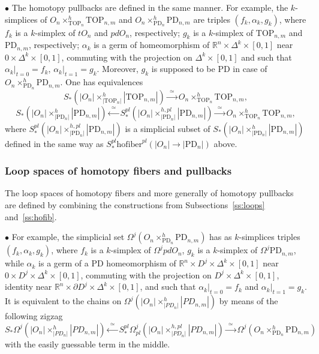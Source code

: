 \documentclass[11pt]{amsart}
\theoremstyle{definition}
\newcommand{\R}{{\mathbb R}}
\newcommand{\TOP}{\mathrm{TOP}}
\newcommand{\PD}{\mathrm{PD}}
\newcommand{\hofiber}{\mathrm{hofiber}}
\numberwithin{equation}{section}
\begin{document}
$\bullet$ The homotopy pullbacks are defined in the same manner. For example, the $k$-simplices of $O_n\times_{\TOP_n}^h\TOP_{n,m}$ and
$O_n\times_{\PD_n}^h \PD_{n,m}$ are triples $(f_k,\alpha_k,g_k)$, where $f_k$ is a $k$-simplex of $tO_n$ and $pdO_n$, respectively;
$g_k$ is a $k$-simplex of $\TOP_{n,m}$ and $\PD_{n,m}$, respectively; $\alpha_k$ is a germ of homeomorphism of $\R^n\times \Delta^k\times [0,1]$
near $0\times \Delta^k\times [0,1]$, commuting with the projection on $\Delta^k\times [0,1]$ and such that $\alpha_k|_{t=0}=f_k$, $\alpha_k|_{t=1}=g_k$.
Moreover, $g_k$ is supposed to be PD in case of $O_n\times_{\PD_n}^h \PD_{n,m}$. One has equivalences
\[
S_*\left(|O_n|\times^h_{|\TOP_n|}|\TOP_{n,m}|\right)\xrightarrow{\,\,\simeq\,\,} O_n\times_{\TOP_n}^h\TOP_{n,m},
\]
\[
S_*\left(|O_n|\times^h_{|\PD_n|}|\PD_{n,m}|\right)
\xleftarrow{\,\,\simeq\,\,}S_*^{pl}\left(|O_n|\times^{h,pl}_{|\PD_n|}|\PD_{n,m}|\right)\xrightarrow{\,\,\simeq\,\,} O_n\times_{\TOP_n}^h\TOP_{n,m},
\]
where $S_*^{pl}\left(|O_n|\times^{h,pl}_{|\PD_n|}|\PD_{n,m}|\right)$ is a simplicial subset of $S_*\left(|O_n|\times^h_{|\PD_n|}|\PD_{n,m}|\right)$ defined in the same way as $S^{pl}_*\hofiber^{pl}\left(|O_n|\to |\PD_n|\right)$ above.

\subsubsection{Loop spaces of  homotopy fibers and pullbacks}\label{sss:loops}
The loop spaces of homotopy fibers and more generally of homotopy pullbacks are defined by combining the  constructions from Subsections~\ref{ss:loops}
and~\ref{ss:hofib}.

$\bullet$ For example, the simplicial set $\Omega^j\left(O_n\times_{\PD_n}^h \PD_{n,m}\right)$ has as $k$-simplices triples $(f_k,\alpha_k,g_k)$,
where $f_k$ is a $k$-simplex of $\Omega^jpdO_n$, $g_k$ is a $k$-simplex of $\Omega^j\PD_{n,m}$, while $\alpha_k$ is a germ of a PD homeomorphism
of  $\R^n\times D^j\times \Delta^k\times [0,1]$ near $0\times D^j\times \Delta^k\times [0,1]$, commuting with the projection on $ D^j\times \Delta^k\times [0,1]$, identity near $\R^n\times \partial D^j\times \Delta^k\times [0,1]$, and such that $\alpha_k|_{t=0}=f_k$ and $\alpha_k|_{t=1}=g_k$. 
It is
equivalent to the chains on $\Omega^j\left(|O_n|\times_{|PD_n|}^h|PD_{n,m}|\right)$ by means of the following zigzag
\[
S_*\Omega^j\left(|O_n|\times_{|PD_n|}^h|PD_{n,m}|\right)\xleftarrow{\,\,\simeq\,\,}
S^{pl}_*\Omega^j_{pl}\left(|O_n|\times_{|PD_n|}^{h,pl}|PD_{n,m}|\right)\xrightarrow{\,\,\simeq\,\,}
\Omega^j\left(O_n\times_{\PD_n}^h \PD_{n,m}\right)
\]
with the easily guessable term in the middle. 
\end{document}
